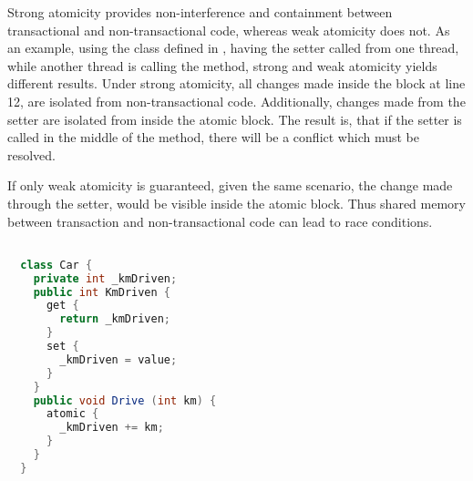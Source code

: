 Strong atomicity provides non-interference and containment between transactional and non-transactional code, whereas weak atomicity does not. As an example, using the  class defined in , having the  setter called from one thread, while another thread is calling the  method, strong and weak atomicity yields different results. Under strong atomicity, all changes made inside the  block at line 12, are isolated from non-transactional code. Additionally, changes made from the setter are isolated from inside the atomic block. The result is, that if the setter is called in the middle of the  method, there will be a conflict which must be resolved. 

If only weak atomicity is guaranteed, given the same scenario, the change made through the setter, would be visible inside the atomic block. Thus shared memory between transaction and non-transactional code can lead to race conditions.
%

\begin{lstlisting}[label=lst:atomicity,
  caption={Level of Atomicity},
  language=Java,  
  showspaces=false,
  showtabs=false,
  breaklines=true,
  showstringspaces=false,
  breakatwhitespace=true,
  commentstyle=\color{greencomments},
  keywordstyle=\color{bluekeywords},
  stringstyle=\color{redstrings},
  morekeywords={atomic, retry, orElse, var, get, set}]  % Start your code-block

  class Car {
    private int _kmDriven;
    public int KmDriven {
      get {
        return _kmDriven;
      }
      set {
        _kmDriven = value;
      }
    }
    public void Drive (int km) {
      atomic {
        _kmDriven += km;
      }
    }
  }
\end{lstlisting}

